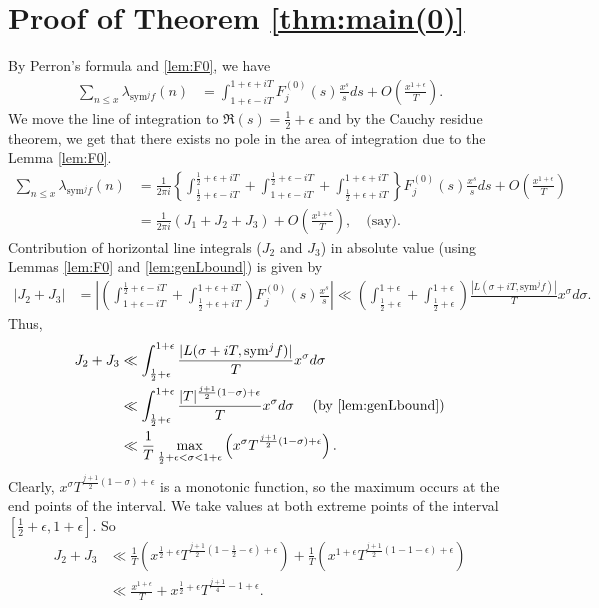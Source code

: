 \documentclass[10pt]{amsart}
\begin{document}
\section{Proof of Theorem \ref{thm:main(0)}} \label{sec:main0}
By Perron's formula and \eqref{lem:F0}, we have \begin{align}
    \sum_{n\leq x}\lambda_{\mathrm{sym}^{j}f}(n) & = \int_{1+\epsilon-iT}^{1+\epsilon+iT}F_{j}^{(0)}(s)\frac{x^s}{s}ds + O\left( \frac{x^{1+\epsilon}}{T}\right).
\end{align}
We move the line of integration to $\Re(s) = \frac{1}{2}+\epsilon$ and by the Cauchy residue theorem, we get that there exists no pole in the area of integration due to the Lemma \ref{lem:F0}.
\begin{align} \label{eq:sum_l0}
    \sum_{n\leq x}\lambda_{\mathrm{sym}^{j}f}(n) & = \frac{1}{2\pi i}\left\{\int_{\frac{1}{2}+\epsilon-iT}^{\frac{1}{2}+\epsilon+iT}+\int_{1+\epsilon-iT}^{\frac{1}{2}+\epsilon-iT}+\int_{\frac{1}{2}+\epsilon+iT}^{1+\epsilon+iT}\right\}F_{j}^{(0)}(s)\frac{x^{s}}{s}ds + O\left(\frac{x^{1+\epsilon}}{T}\right) \\
    &= \frac{1}{2\pi i}(J_{1}+J_{2}+J_{3})+O\left(\frac{x^{1+\epsilon}}{T}\right), \quad \text{(say)} .
\end{align}
Contribution of horizontal line integrals ($J_{2}$ and $J_{3}$) in absolute value (using Lemmas \ref{lem:F0} and \ref{lem:genLbound}) is given by
\begin{align*}
|J_2+J_3| &= \left| \left( \int_{1+\epsilon-iT}^{\frac{1}{2}+\epsilon-iT}+\int_{\frac{1}{2}+\epsilon+iT}^{1+\epsilon+iT} \right)F_j^{(0)}(s)\frac{x^s}{s}\right|\ll  \left( \int_{\frac{1}{2}+\epsilon}^{1+\epsilon} + \int_{\frac{1}{2}+\epsilon}^{1+\epsilon}\right) \frac{|L(\sigma+iT, \mathrm{sym}^j f)|}{T}x^\sigma d\sigma .
\end{align*}
Thus, 
\begin{align*}
    J_2+J_3 &\ll \int_{\frac{1}{2}+\epsilon}^{1+\epsilon} \frac{|L(\sigma+iT , \mathrm{sym}^j f)|}{T}x^{\sigma}d\sigma \\
&\ll \int_{\frac{1}{2}+\epsilon}^{1+\epsilon} \frac{|T|^{\frac{j+1}{2}(1-\sigma)+\epsilon}}{T}x^{\sigma}d\sigma \quad \text{ (by \ref{lem:genLbound})} \\
&\ll \frac{1}{T} \max_{\frac{1}{2}+\epsilon < \sigma < 1+\epsilon} \left( x^\sigma T^{\frac{j+1}{2}(1-\sigma)+\epsilon}\right) .
\end{align*}
Clearly, $x^\sigma T^{\frac{j+1}{2}(1-\sigma)+\epsilon}$ is a monotonic function, so the maximum occurs at the end points of the interval. We take values at both extreme points of the interval $[\frac{1}{2}+\epsilon, 1+\epsilon]$. So 
\begin{align*}
    J_2+J_3 &\ll \frac{1}{T}\left( x^{\frac{1}{2}+\epsilon}T^{\frac{j+1}{2} (1-\frac{1}{2}-\epsilon) +\epsilon} \right) +  \frac{1}{T}\left( x^{1+\epsilon}T^{\frac{j+1}{2} (1-1-\epsilon) +\epsilon}
    \right) \\
    &\ll \frac{x^{1+\epsilon}}{T}+x^{\frac{1}{2}+\epsilon}T^{\frac{j+1}{4}-1+\epsilon}.
\end{align*}
\end{document}
